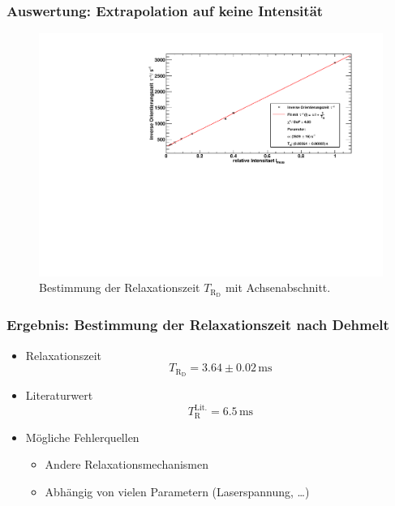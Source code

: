 \begin{frame}
\frametitle{Auswertung: Extrapolation auf keine Intensität}
\begin{figure}
    \begin{center}
        \includegraphics[width=\textwidth]{../img/taufit.pdf}
        \caption{Bestimmung der Relaxationszeit $T_{\text{R}_\text{D}}$ mit Achsenabschnitt.}
    \end{center}
\end{figure}
\end{frame}

\begin{frame}
\frametitle{Ergebnis: Bestimmung der Relaxationszeit nach Dehmelt}
\begin{itemize}[<+->]
    \item Relaxationszeit
    \begin{equation*}
        T_{\text{R}_\text{D}} = 3.64 \pm 0.02\,\text{ms}
    \end{equation*}
    \item Literaturwert
    \begin{equation*}
        T_{\text{R}}^\text{Lit.} = 6.5\,\text{ms}
    \end{equation*}
    \item Mögliche Fehlerquellen
    \begin{itemize}[<+->]
        \item Andere Relaxationsmechanismen
        \item Abhängig von vielen Parametern (Laserspannung, \ldots)
    \end{itemize}
\end{itemize}
\end{frame}